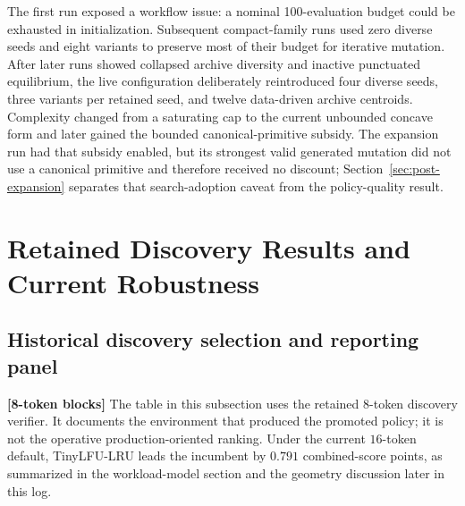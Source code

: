 \documentclass[11pt]{article}
\newcommand{\blocktag}[1]{\textbf{\color{navy}[#1-token blocks]}}
\begin{document}
The first run exposed a workflow issue: a nominal 100-evaluation budget could be
exhausted in initialization.  Subsequent compact-family runs used zero diverse seeds
and eight variants to preserve most of their budget for iterative mutation.  After
later runs showed collapsed archive diversity and inactive punctuated equilibrium, the
live configuration deliberately reintroduced four diverse seeds, three variants per
retained seed, and twelve data-driven archive centroids.  Complexity changed from a
saturating cap to the current unbounded concave form and later gained the bounded
canonical-primitive subsidy.  The expansion run had that subsidy enabled, but its
strongest valid generated mutation did not use a canonical primitive and therefore
received no discount; Section~\ref{sec:post-expansion} separates that search-adoption
caveat from the policy-quality result.

\section{Retained Discovery Results and Current Robustness}

\subsection{Historical discovery selection and reporting panel}

\blocktag{8} The table in this subsection uses the retained \(8\)-token discovery
verifier.  It documents the environment that produced the promoted policy; it is not
the operative production-oriented ranking.  Under the current \(16\)-token default,
TinyLFU-LRU leads the incumbent by \(0.791\) combined-score points, as summarized in
the workload-model section and the geometry discussion later in this log.
\end{document}
